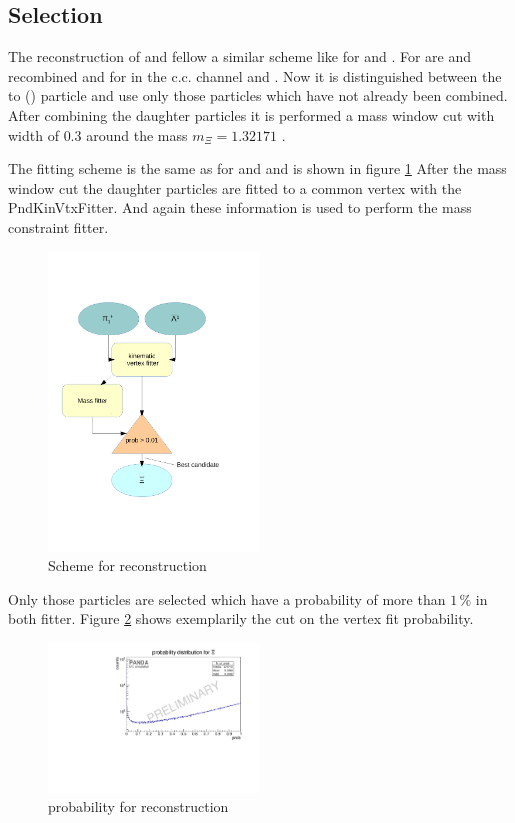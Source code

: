 	\subsection*{Selection}
		The reconstruction of \cascade and \anticascade fellow a similar scheme like for \lam and \alam.
		For \anticascade are \alam and \piplusone recombined and for \cascade in the c.c. channel \lam and \piminusone.
		Now it is distinguished between the to \piplus (\piminus) particle and use only those particles which have not already been combined.
		After combining the daughter particles it is performed a mass window cut with width of $0.3$\massunit 
		around the \cascade mass $m_{\Xi} = 1.32171$ \massunit \cite{PDG}.
		 
		The fitting scheme is the same as for \lam and \alam and is shown in figure \ref{fig:anticascade_scheme} 
		After the mass window cut the daughter particles are fitted to a common vertex with the PndKinVtxFitter.
		And again these information is used to perform the mass constraint fitter. 
		
		\begin{figure}
			\centering
				\includegraphics[width=0.50\textwidth]{./plots/combineAntiCascade.pdf}
			\caption{Scheme for \anticascade reconstruction}
			\label{fig:anticascade_scheme}
		\end{figure}
		
		Only those particles are selected which have a \chisq probability of more than $1\,\%$ in both fitter. 
		Figure \ref{fig:XiPlus_prob} shows exemplarily the cut on the vertex fit probability.
		
		\begin{figure}
			\centering
				\includegraphics[width=0.50\textwidth]{./plots/Xi/XiPlus_prob.pdf}
			\caption{\chisq probability for \anticascade reconstruction}
			\label{fig:XiPlus_prob}
		\end{figure}
			
